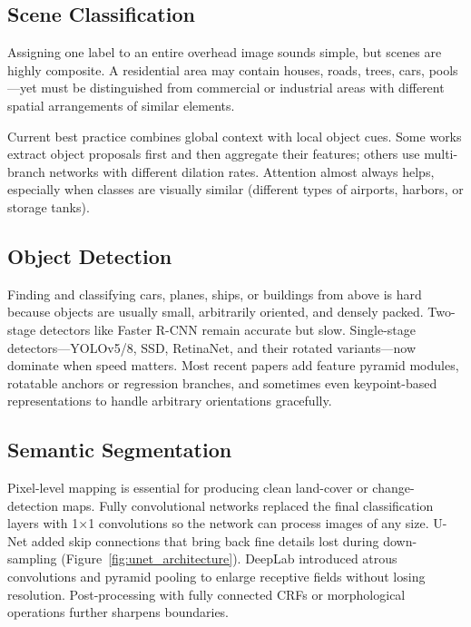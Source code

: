 \documentclass[12pt,a4paper]{article}
\begin{document}
\subsection{Scene Classification}

Assigning one label to an entire overhead image sounds simple, but scenes are highly composite. A residential area may contain houses, roads, trees, cars, pools—yet must be distinguished from commercial or industrial areas with different spatial arrangements of similar elements.

Current best practice combines global context with local object cues. Some works extract object proposals first and then aggregate their features; others use multi-branch networks with different dilation rates. Attention almost always helps, especially when classes are visually similar (different types of airports, harbors, or storage tanks).

\subsection{Object Detection}

Finding and classifying cars, planes, ships, or buildings from above is hard because objects are usually small, arbitrarily oriented, and densely packed. Two-stage detectors like Faster R-CNN remain accurate but slow. Single-stage detectors—YOLOv5/8, SSD, RetinaNet, and their rotated variants—now dominate when speed matters. Most recent papers add feature pyramid modules, rotatable anchors or regression branches, and sometimes even keypoint-based representations to handle arbitrary orientations gracefully.

\subsection{Semantic Segmentation}

Pixel-level mapping is essential for producing clean land-cover or change-detection maps. Fully convolutional networks replaced the final classification layers with 1×1 convolutions so the network can process images of any size. U-Net added skip connections that bring back fine details lost during down-sampling (Figure~\ref{fig:unet_architecture}). DeepLab introduced atrous convolutions and pyramid pooling to enlarge receptive fields without losing resolution. Post-processing with fully connected CRFs or morphological operations further sharpens boundaries.
\end{document}
